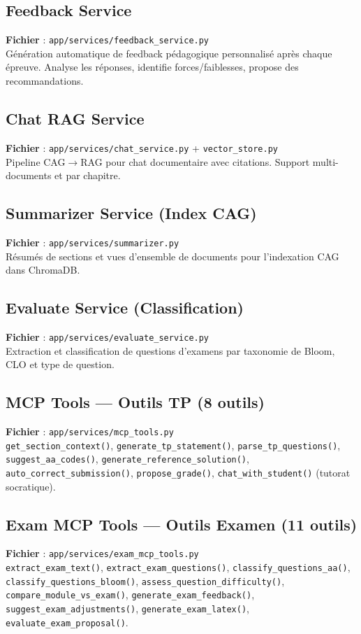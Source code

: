 \documentclass[12pt,a4paper]{article}
\begin{document}
\subsection{Feedback Service}
\textbf{Fichier} : \texttt{app/services/feedback\_service.py} \\
Génération automatique de feedback pédagogique personnalisé après chaque épreuve. Analyse les réponses, identifie forces/faiblesses, propose des recommandations.

\subsection{Chat RAG Service}
\textbf{Fichier} : \texttt{app/services/chat\_service.py} + \texttt{vector\_store.py} \\
Pipeline CAG$\rightarrow$RAG pour chat documentaire avec citations. Support multi-documents et par chapitre.

\subsection{Summarizer Service (Index CAG)}
\textbf{Fichier} : \texttt{app/services/summarizer.py} \\
Résumés de sections et vues d'ensemble de documents pour l'indexation CAG dans ChromaDB.

\subsection{Evaluate Service (Classification)}
\textbf{Fichier} : \texttt{app/services/evaluate\_service.py} \\
Extraction et classification de questions d'examens par taxonomie de Bloom, CLO et type de question.

\subsection{MCP Tools --- Outils TP (8 outils)}
\textbf{Fichier} : \texttt{app/services/mcp\_tools.py} \\
\texttt{get\_section\_context()}, \texttt{generate\_tp\_statement()}, \texttt{parse\_tp\_questions()}, \texttt{suggest\_aa\_codes()}, \texttt{generate\_reference\_solution()}, \texttt{auto\_correct\_submission()}, \texttt{propose\_grade()}, \texttt{chat\_with\_student()} (tutorat socratique).

\subsection{Exam MCP Tools --- Outils Examen (11 outils)}
\textbf{Fichier} : \texttt{app/services/exam\_mcp\_tools.py} \\
\texttt{extract\_exam\_text()}, \texttt{extract\_exam\_questions()}, \texttt{classify\_questions\_aa()}, \texttt{classify\_questions\_bloom()}, \texttt{assess\_question\_difficulty()}, \texttt{compare\_module\_vs\_exam()}, \texttt{generate\_exam\_feedback()}, \texttt{suggest\_exam\_adjustments()}, \texttt{generate\_exam\_latex()}, \texttt{evaluate\_exam\_proposal()}.
\end{document}
